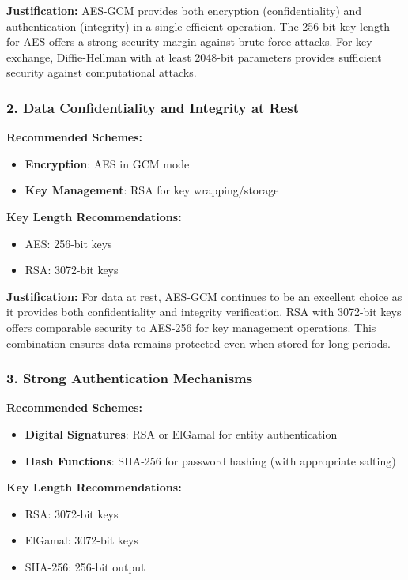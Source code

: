 \documentclass{article}
\begin{document}
\begin{enumerate}[label=\textbf{Task \arabic*:}]
\begin{tcolorbox}
		\textbf{Justification:} AES-GCM provides both encryption (confidentiality) and authentication (integrity) in a single efficient operation. The 256-bit key length for AES offers a strong security margin against brute force attacks. For key exchange, Diffie-Hellman with at least 2048-bit parameters provides sufficient security against computational attacks.
		
		\subsubsection*{2. Data Confidentiality and Integrity at Rest}
		\textbf{Recommended Schemes:}
		\begin{itemize}
			\item \textbf{Encryption}: AES in GCM mode
			\item \textbf{Key Management}: RSA for key wrapping/storage
		\end{itemize}
		
		\textbf{Key Length Recommendations:}
		\begin{itemize}
			\item AES: 256-bit keys
			\item RSA: 3072-bit keys
		\end{itemize}
		
		\textbf{Justification:} For data at rest, AES-GCM continues to be an excellent choice as it provides both confidentiality and integrity verification. RSA with 3072-bit keys offers comparable security to AES-256 for key management operations. This combination ensures data remains protected even when stored for long periods.
		
		\subsubsection*{3. Strong Authentication Mechanisms}
		\textbf{Recommended Schemes:}
		\begin{itemize}
			\item \textbf{Digital Signatures}: RSA or ElGamal for entity authentication
			\item \textbf{Hash Functions}: SHA-256 for password hashing (with appropriate salting)
		\end{itemize}
		
		\textbf{Key Length Recommendations:}
		\begin{itemize}
			\item RSA: 3072-bit keys
			\item ElGamal: 3072-bit keys
			\item SHA-256: 256-bit output
		\end{itemize}
		

\end{tcolorbox}
\end{enumerate}
\end{document}
